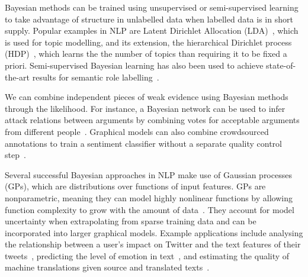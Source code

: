 Bayesian methods can be trained using unsupervised or semi-supervised learning
to take advantage of structure in unlabelled data when labelled data is in short supply.
Popular examples in NLP are
Latent Dirichlet Allocation (LDA)~\cite{blei2003latent}, which is used for topic modelling,
and its extension, the hierarchical Dirichlet process (HDP)~\cite{teh2005sharing}, which learns the 
the number of topics than requiring it to be fixed a priori.
Semi-supervised Bayesian learning
has also been used to achieve state-of-the-art results for semantic role labelling~\cite{titov2012bayesian}.

We can combine independent pieces of weak evidence using Bayesian methods through the likelihood.
For instance, a Bayesian network can be used to infer attack relations between arguments by combining votes for acceptable arguments from different people~\cite{kido2017}.
Graphical models can also combine crowdsourced annotations to train a sentiment classifier
without a separate quality control step~\cite{simpson2015language,felt2016semantic}.

Several successful Bayesian approaches in NLP make use of Gaussian processes (GPs), which are 
distributions over functions of input features. 
GPs are nonparametric, meaning they can model highly nonlinear functions by
allowing function complexity to grow with the amount of data~\cite{rasmussen_gaussian_2006}.
They account for model uncertainty when extrapolating from sparse training data
and can be incorporated into larger graphical models.
Example applications include analysing the relationship between a user's impact on Twitter 
and the text features of their tweets~\cite{lampos2014predicting}, 
predicting the level of emotion in text~\cite{beck2014joint},
and estimating the quality of machine translations given source and translated texts~\cite{cohn2013modelling}.

